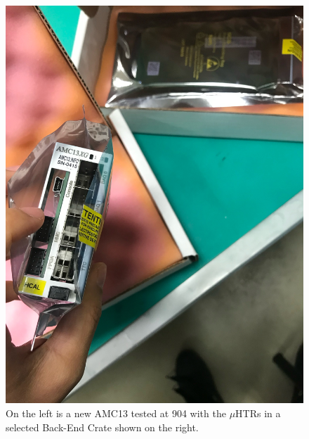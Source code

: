 \begin{figure}[!htbp]
	\centering
    \caption{On the left is a new AMC13 tested at 904 with the $\mu$HTRs in a selected Back-End Crate shown on the right.}
	\includegraphics[scale=0.07]{fig/AMC13Reprogramming.jpg}

\end{figure}
